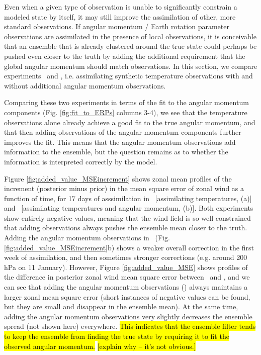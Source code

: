 Even when a given type of observation is unable to significantly constrain a modeled state by itself, it may still improve the assimilation of other, more standard observations.  
If angular momentum / Earth rotation parameter observations are assimilated in the presence of local observations, it is conceivable that an ensemble that is already clustered around the true state could perhaps be pushed even closer to the truth by adding the additional requirement that the global angular momentum should match observations. 
In this section, we compare experiments \RST~and \ERPRST, i.e. assimilating synthetic temperature observations with and without additional angular momentum observations.

Comparing these two experiments in terms of the fit to the angular momentum components (Fig. \ref{fig:fit_to_ERPs} columns 3-4), we see that the temperature observations alone already achieve a good fit to the true angular momentum, and that 
then adding observations of the angular momentum components further improves the fit.  
This means that the angular momentum observations add information to the ensemble, but the question remains as to whether the information is interpreted correctly by the model.

Figure \ref{fig:added_value_MSEincrement} shows zonal mean profiles of the increment (posterior minus prior) in the mean square error of zonal wind as a function of time, for 17 days of asssimilation in \RST~[assimilating temperatures, (a)] and \ERPRST~[assimilating temperatures and angular momentum, (b)].  
Both experiments show entirely negative values, meaning that the wind field is so well constrained that adding observations always pushes the ensemble mean closer to the truth. 
Adding the angular momentum observations in \ERPRST~(Fig. \ref{fig:added_value_MSEincrement}b) shows a weaker overall correction in the first week of assimilation, and then sometimes stronger corrections (e.g. around 200 hPa on 11 January). 
However, 
Figure \ref{fig:added_value_MSE} shows profiles of the difference in posterior zonal wind mean square error between \ERPRST~and \RST, and we can see that 
adding the angular momentum observations (\ERPRST) always maintains a larger zonal mean square error (short instances of negative values can be found, but they are small and disappear in the ensemble mean). 
At the same time, adding the angular momentum observations very slightly decreases the ensemble spread (not shown here) everywhere.  
\hl{This indicates that the ensemble filter tends to keep the ensemble from finding the true state by requiring it to fit the observed angular momentum.}  
\hl{[explain why -- it's not obvious.]}
